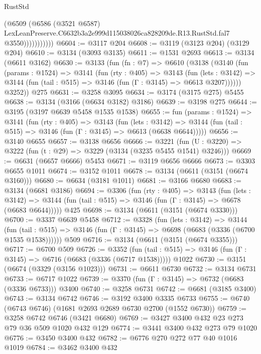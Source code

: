 \begin{lexlean}{RustStd}
\begin{coremodule}
                      (@6509
                        (@6586
                          (@3521 @6587)
                          LexLeanPreserve.C6632b3a2e999d115038026ca828209de.R13.RustStd.fal7
                          @3550)))))))))))
@6604 := @3117 @204
@6608 := @3119 (@3123 @204) (@3129 @204)
@6610 := @3134 (@3093 @3135)
@6611 := @1531 @2693
@6613 := @3134 (@6611 @3162)
@6630 := @3133
    (fun (fn : @7) =>
    @6610
      (@3138
        (@3140
          (fun (params : @1524) =>
          @3141
            (fun (rty : @405) =>
            @3143
              (fun (lets : @3142) =>
              @3144 (fun (tail : @515) => @3146 (fun (Γ : @3145) => @6613 @3207))))))
        @3252))
    @275
@6631 := @3258 @3095
@6634 := @3174 (@3175 @275) @5455
@6638 := @3134 (@3166 (@6634 @3182) @3186)
@6639 := @3198 @275
@6644 := @3195 (@3197 @6639 @5458 @1535 @1538)
@6655 := fun (params : @1524) =>
  @3141
    (fun (rty : @405) =>
    @3143
      (fun (lets : @3142) =>
      @3144 (fun (tail : @515) => @3146 (fun (Γ : @3145) => @6613 (@6638 @6644)))))
@6656 := @3140 @6655
@6657 := @3138 @6656
@6666 := @3221 (fun (U : @3220) => @3222 (fun (t : @29) => @3229 (@3134 (@3235 @5455 @1541) @3246)))
@6669 := @6631 (@6657 @6666) @5453
@6671 := @3119 @6656 @6666
@6673 := @3303 @6655 @1011
@6674 := @3152 @1011
@6678 := @3134 (@6611 (@3151 (@6674 @3160)))
@6680 := @6634 (@3181 @1011)
@6681 := @3166 @6680
@6683 := @3134 (@6681 @3186)
@6694 := @3306
    (fun (rty : @405) =>
    @3143
      (fun (lets : @3142) =>
      @3144 (fun (tail : @515) => @3146 (fun (Γ : @3145) => @6678 (@6683 @6644)))))
    @425
@6698 := @3134 (@6611 (@3151 (@6674 @3330)))
@6700 := @3337 @6639 @5458
@6712 := @3328
    (fun (lets : @3142) =>
    @3144
      (fun (tail : @515) => @3146 (fun (Γ : @3145) => @6698 (@6683 (@3336 (@6700 @1535 @1538))))))
    @509
@6716 := @3134 (@6611 (@3151 (@6674 @3355)))
@6717 := @6700 @509
@6726 := @3352
    (fun (tail : @515) => @3146 (fun (Γ : @3145) => @6716 (@6683 (@3336 (@6717 @1538)))))
    @1022
@6730 := @3151 (@6674 (@3329 (@3156 @1023)))
@6731 := @6611 @6730
@6732 := @3134 @6731
@6733 := @6717 @1022
@6739 := @3370 (fun (Γ : @3145) => @6732 (@6683 (@3336 @6733))) @3400
@6740 := @3258 @6731
@6742 := @6681 (@3185 @3400)
@6743 := @3134 @6742
@6746 := @3192 @3400 @3335 @6733
@6755 := @6740 (@6743 @6746) (@1681 @2693 @2689 @6730 @2700 (@1552 @6730))
@6759 := @3258 @6742 @6746 (@3421 @6680)
@6769 := @3427 @3400 @432 @23 @273 @79 @36 @509 @1020 @432 @129
@6774 := @3441 @3400 @432 @273 @79 @1020
@6776 := @3450 @3400 @432
@6782 := @6776 @270 @272 @77 @40 @1016 @1019
@6784 := @3462 @3400 @432

\end{coremodule}
\end{lexlean}
